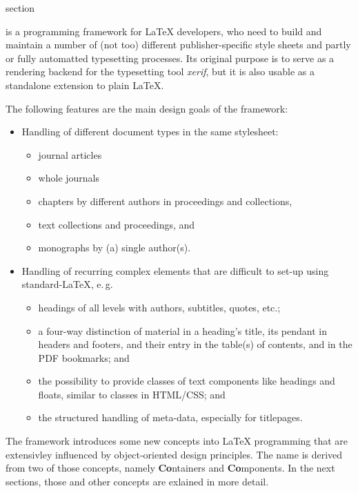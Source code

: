 \begin{Heading}{section}
\end{Heading}

{\CoCoTeX} is a programming framework for {\LaTeX} developers, who
need to build and maintain a number of (not too) different
publisher-specific style sheets and partly or fully automatted
typesetting processes. Its original purpose is to serve as a rendering
backend for the typesetting tool \textit{xerif}, but it is also usable
as a standalone extension to plain {\LaTeX}.

The following features are the main design goals of the {\CoCoTeX}
framework:
\begin{itemize}
\item Handling of different document types in the same stylesheet:
  \begin{itemize}
  \item journal articles
  \item whole journals
  \item chapters by different authors in proceedings and collections,
  \item text collections and proceedings, and
  \item monographs by (a) single author(s).
  \end{itemize}
\item Handling of recurring complex elements that are difficult to
  set-up using standard-\LaTeX, e.\,g.
  \begin{itemize}
  \item headings of all levels with authors, subtitles, quotes, etc.;
  \item a four-way distinction of material in a heading's title, its
    pendant in headers and footers, and their entry in the table(s) of
    contents, and in the PDF bookmarks; and
  \item the possibility to provide classes of text components like
    headings and floats, similar to classes in HTML/CSS; and
  \item the structured handling of meta-data, especially for
    titlepages.
  \end{itemize}
\end{itemize}

The framework introduces some new concepts into {\LaTeX} programming
that are extensivley influenced by object-oriented design principles.
The name {\CoCoTeX} is derived from two of those concepts, namely
\textbf{Co}ntainers and \textbf{Co}mponents. In the next sections,
those and other concepts are exlained in more detail.



